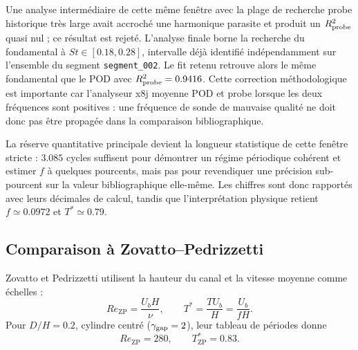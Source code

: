 \documentclass[11pt,a4paper]{article}
\begin{document}
Une analyse intermédiaire de cette même fenêtre avec la plage de recherche probe historique très large avait accroché une harmonique parasite et produit un $R^2_{\rm probe}$ quasi nul ; ce résultat est rejeté. L'analyse finale borne la recherche du fondamental à $St\in[0.18,0.28]$, intervalle déjà identifié indépendamment sur l'ensemble du segment \texttt{segment\_002}. Le fit retenu retrouve alors le même fondamental que le POD avec $R^2_{\rm probe}=0.9416$. Cette correction méthodologique est importante car l'analyseur x8j moyenne POD et probe lorsque les deux fréquences sont positives : une fréquence de sonde de mauvaise qualité ne doit donc pas être propagée dans la comparaison bibliographique.

La réserve quantitative principale devient la longueur statistique de cette fenêtre stricte : $3.085$ cycles suffisent pour démontrer un régime périodique cohérent et estimer $f$ à quelques pourcents, mais pas pour revendiquer une précision sub-pourcent sur la valeur bibliographique elle-même. Les chiffres sont donc rapportés avec leurs décimales de calcul, tandis que l'interprétation physique retient $f\simeq0.0972$ et $T^*\simeq0.79$.

\subsection{Comparaison à Zovatto--Pedrizzetti}

Zovatto et Pedrizzetti utilisent la hauteur du canal et la vitesse moyenne comme échelles \cite{ZovattoPedrizzetti2001} :
\begin{equation}
 Re_{\mathrm{ZP}}=\frac{U_bH}{\nu},
 \qquad
 T^*=\frac{TU_b}{H}=\frac{U_b}{fH}.
 \label{eq:x8-zp-def}
\end{equation}
Pour $D/H=0.2$, cylindre centré ($\gamma_{\rm gap}=2$), leur tableau de périodes donne
\begin{equation}
 Re_{\mathrm{ZP}}=280,\qquad T^*_{\mathrm{ZP}}=0.83.
\end{equation}
\end{document}

